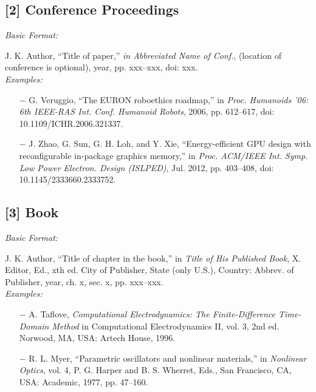\documentclass{iaesarticle}
\begin{document}
\subsection*{[2]	Conference Proceedings}
\footnotesize
\begin{flushleft}
\textsl{Basic Format:\\}
\end{flushleft}
\vspace{-1.1em} 
J. K. Author, “Title of paper,” \textsl{in Abbreviated Name of Conf.}, (location of conference is optional), year, pp. xxx–xxx, doi: xxx. \\
\emph{Examples:}
\begin{enumerate} [leftmargin=*, topsep=0.3ex, itemsep=0.3ex, parsep=0.2ex]
\footnotesize
\item[$-$] G. Veruggio, “The EURON roboethics roadmap,” in \textsl{Proc. Humanoids ’06: 6th IEEE-RAS Int. Conf. Humanoid Robots}, 2006, pp. 612–617, doi: 10.1109/ICHR.2006.321337. 
\item[$-$]	J. Zhao, G. Sun, G. H. Loh, and Y. Xie, “Energy-efficient GPU design with reconfigurable in-package graphics memory,” in \textsl{Proc. ACM/IEEE Int. Symp. Low Power Electron. Design (ISLPED)}, Jul. 2012, pp. 403–408, doi: 10.1145/2333660.2333752.
\end{enumerate}


\subsection*{[3] Book}
\footnotesize
\begin{flushleft}
\textsl{Basic Format:\\}
\end{flushleft}
\vspace{-1.1em} 
\footnotesize
J. K. Author, “Title of chapter in the book,” in \textsl{Title of His Published Book}, X. Editor, Ed., xth ed. City of Publisher, State (only U.S.), Country: Abbrev. of Publisher, year, ch. x, sec. x, pp. xxx–xxx. \\
\textsl{Examples:}
\begin{enumerate} [leftmargin=*, topsep=0.3ex, itemsep=0.3ex, parsep=0.2ex]
\footnotesize
    \item[$-$] A. Taflove, \textsl{Computational Electrodynamics: The Finite-Difference Time-Domain Method} in Computational Electrodynamics II, vol. 3, 2nd ed. Norwood, MA, USA: Artech House, 1996. 
		\item[$-$] R. L. Myer, “Parametric oscillators and nonlinear materials,” in \textsl{Nonlinear Optics}, vol. 4, P. G. Harper and B. S. Wherret, Eds., San Francisco, CA, USA: Academic, 1977, pp. 47–160.
\end{enumerate}
\end{document}
